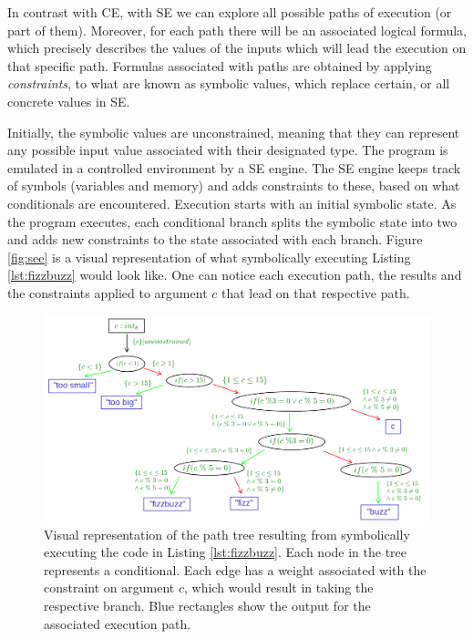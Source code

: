 In contrast with \gls{CE}, with \gls{SE} we can explore all possible paths of execution (or part of them). Moreover, for each path there will be an associated logical formula, which precisely describes the values of the inputs which will lead the execution on that specific path. Formulas associated with paths are obtained by applying \emph{constraints}, to what are known as symbolic values, which replace certain, or all concrete values in \gls{SE}.

Initially, the symbolic values are unconstrained, meaning that they can represent any possible input value associated with their designated type. The program is emulated in a controlled environment by a \gls{SE} engine. The \gls{SE} engine keeps track of symbols (variables and memory) and adds constraints to these, based on what conditionals are encountered. Execution starts with an initial symbolic state. As the program executes, each conditional branch splits the symbolic state into two and adds new constraints to the state associated with each branch. Figure \ref{fig:see} is a visual representation of what symbolically executing Listing \ref{lst:fizzbuzz} would look like. One can notice each execution path, the results and the constraints applied to argument $c$ that lead on that respective path.

\begin{figure}[h]
    \centering
    \includegraphics[width=\textwidth]{./images/SE}
    \caption{Visual representation of the path tree resulting from symbolically executing the code in Listing \ref{lst:fizzbuzz}. Each node in the tree represents a conditional. Each edge has a weight associated with the constraint on argument $c$, which would result in taking the respective branch. Blue rectangles show the output for the associated execution path.}
    \label{fig:se}
\end{figure}


